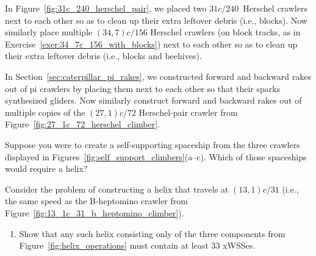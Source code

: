 \begin{multicols}{2}
\mfilbreak


\begin{problem}\label{exer:34_7c_156_cleanup} 
	In Figure~\ref{fig:31c_240_herschel_pair}, we placed two $31c/240$~Herschel crawlers next to each other so as to clean up their extra leftover debris (i.e., blocks). Now similarly place multiple $(34,7)c/156$ Herschel crawlers (on block tracks, as in Exercise~\ref{exer:34_7c_156_with_blocks}) next to each other so as to clean up their extra leftover debris (i.e., blocks and beehives).
\end{problem}


\mfilbreak


\begin{problem}\label{exer:27_1c_72_rakes} 
	In Section~\ref{sec:caterpillar_pi_rakes}, we constructed forward and backward rakes out of pi crawlers by placing them next to each other so that their sparks synthesized gliders. Now similarly construct forward and backward rakes out of multiple copies of the $(27,1)c/72$ Herschel-pair crawler from Figure~\ref{fig:27_1c_72_herschel_climber}.
\end{problem}


\mfilbreak


\begin{problemstar}\label{exer:make_self_support_need_helix} 
	Suppose you were to create a self-supporting spaceship from the three crawlers displayed in Figures~\ref{fig:self_support_climbers}(a--c). Which of those spaceships would require a helix?
\end{problemstar}


\mfilbreak

\vspace*{9cm}

\begin{problemstar}\label{exer:13_1c_31_helix_large} 
	Consider the problem of constructing a helix that travels at $(13,1)c/31$ (i.e., the same speed as the B-heptomino crawler from Figure~\ref{fig:13_1c_31_b_heptomino_climber}).\smallskip
	
	\begin{enumerate}[label=\bf\color{ocre}(\alph*)]
		\item Show that any such helix consisting only of the three components from Figure~\ref{fig:helix_operations} must contain at least 33 xWSSes.
		

\end{enumerate}
\end{problemstar}
\end{multicols}
